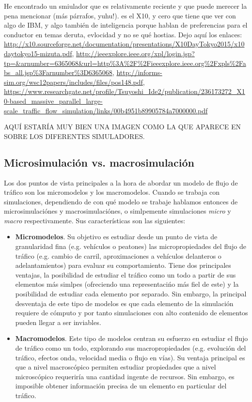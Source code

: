 He encontrado un smiulador que es relativamente reciente y que puede merecer la pena mencionar (más párrafos, yuhu!). es el X10, y cero que tiene que ver con algo de IBM, y algo también de inteligencia porque hablan de preferencias para el conductor en temas deruta, evlocidad y no se qué hostias. Dejo aquí los enlaces: \url{http://x10.sourceforge.net/documentation/presentations/X10DayTokyo2015/x10daytokyo15-mizuta.pdf}, \url{http://ieeexplore.ieee.org/xpl/login.jsp?tp=\&arnumber=6365068\&url=http\%3A\%2F\%2Fieeexplore.ieee.org\%2Fxpls\%2Fabs\_all.jsp\%3Farnumber\%3D6365068}, \url{http://informs-sim.org/wsc12papers/includes/files/pos148.pdf}, \url{https://www.researchgate.net/profile/Tsuyoshi\_Ide2/publication/236173272\_X10-based\_massive\_parallel\_large-scale\_traffic\_flow\_simulation/links/00b4951b89905784a7000000.pdf}


AQUÍ ESTARÍA MUY BIEN UNA IMAGEN COMO LA QUE APARECE EN~\cite{krajzewicz2002sumo} SOBRE LOS DIFERENTES SIMULADORES.


\subsection{Microsimulación vs. macrosimulación}

Los dos puntos de vista principales a la hora de abordar un modelo de flujo de tráfico son los micromodelos y los macromodelos. Cuando se trabaja con simulaciones, dependiendo de con qué modelo se trabaje hablamos entonces de microsimulaciónes y macrosimulaciónes, o simlpemente simulaciones \textit{micro} y \textit{macro} respectivamente. Sus características son las siguientes:

\begin{itemize}
	\item \textbf{Micromodelos}. Su objetivo es estudiar desde un punto de vista de granularidad fina (e.g. vehículos o peatones) las micropropiedades del flujo de tráfico (e.g. cambio de carril, aproximaciones a vehículos delanteros o adelantamientos) para evaluar su comportamiento. Tiene dos principales ventajas, la posibilidad de estudiar el tráfico como un todo a partir de sus elementos más simlpes (ofreciendo una representacińo más fiel de este) y la posibilidad de estudiar cada elemento por separado. Sin embargo, la principal desventaja de este tipo de modelos es que cada elemento de la simulación requiere de cómputo y por tanto simulaciones con alto contenido de elementos pueden llegar a ser inviables.
	\item \textbf{Macromodelos}. Este tipo de modelos centran su esfuerzo en estudiar el flujo de tráfico como un todo, explorando sus macropropiedades (e.g. evolución del tráfico, efectos onda, velocidad media o flujo en vías). Su ventaja principal es que a nivel macroscópico permiten estudiar propiedades que a nivel microscópico requeriría una cantidad ingente de recursos. Sin embargo, es imposible obtener información precisa de un elemento en particular del tráfico.
\end{itemize}

